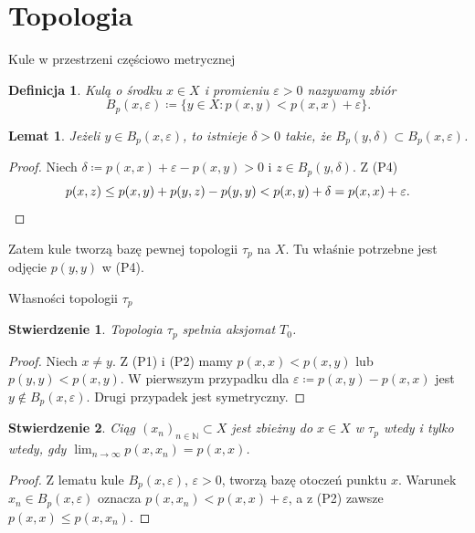 \documentclass{beamer}
\newtheorem*{definicja}{Definicja}
\newtheorem*{stwierdzenie}{Stwierdzenie}
\newtheorem*{lemat}{Lemat}
\newcommand{\N}{\mathbb{N}}
\begin{document}
\section{Topologia}

\begin{frame}{Kule w przestrzeni częściowo metrycznej}
  \begin{definicja}
    \emph{Kulą} o środku $x\in X$ i promieniu $\varepsilon>0$ nazywamy zbiór
    \[
      B_p(x,\varepsilon)\coloneqq\{y\in X : p(x,y)<p(x,x)+\varepsilon\}.
    \]
  \end{definicja}

  \begin{lemat}
    Jeżeli $y\in B_p(x,\varepsilon)$, to istnieje $\delta>0$ takie, że
    $B_p(y,\delta)\subset B_p(x,\varepsilon)$.
  \end{lemat}

  \begin{proof}
    Niech $\delta\coloneqq p(x,x)+\varepsilon-p(x,y)>0$ i $z\in B_p(y,\delta)$. Z (P4)
    \[
      p(x,z)\le p(x,y)+p(y,z)-p(y,y) < p(x,y)+\delta = p(x,x)+\varepsilon. \qedhere
    \]
  \end{proof}

  Zatem kule tworzą bazę pewnej topologii $\tau_p$ na $X$.
  Tu właśnie potrzebne jest odjęcie $p(y,y)$ w (P4).
\end{frame}

\begin{frame}{Własności topologii $\tau_p$}
  \begin{stwierdzenie}
    Topologia $\tau_p$ spełnia aksjomat $T_0$.
  \end{stwierdzenie}
  \begin{proof}
    Niech $x\neq y$. Z (P1) i (P2) mamy $p(x,x)<p(x,y)$ lub $p(y,y)<p(x,y)$.
    W pierwszym przypadku dla $\varepsilon\coloneqq p(x,y)-p(x,x)$ jest
    $y\notin B_p(x,\varepsilon)$. Drugi przypadek jest symetryczny.
  \end{proof}

  \begin{stwierdzenie}
    Ciąg $(x_n)_{n\in\N}\subset X$ jest zbieżny do $x\in X$ w $\tau_p$ wtedy i tylko
    wtedy, gdy $\lim_{n\to\infty}p(x,x_n)=p(x,x)$.
  \end{stwierdzenie}
  \begin{proof}
    Z lematu kule $B_p(x,\varepsilon)$, $\varepsilon>0$, tworzą bazę otoczeń punktu $x$.
    Warunek $x_n\in B_p(x,\varepsilon)$ oznacza $p(x,x_n)<p(x,x)+\varepsilon$,
    a z (P2) zawsze $p(x,x)\le p(x,x_n)$.
  \end{proof}
\end{frame}
\end{document}
